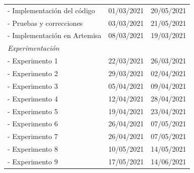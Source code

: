 \begin{table}[!h]
\begin{tabular}{lll}
\multicolumn{1}{l|}{- Implementación del código}                   & \multicolumn{1}{l|}{01/03/2021}                               & 20/05/2021                            \\
\multicolumn{1}{l|}{- Pruebas y correcciones}                      & \multicolumn{1}{l|}{03/03/2021}                               & 21/05/2021                            \\
\multicolumn{1}{l|}{- Implementación en Artemisa}                  & \multicolumn{1}{l|}{08/03/2021}                               & 19/03/2021                            \\ \hline
\multicolumn{3}{l}{\textit{Experimentación}}                                                                                                                                        \\ \hline
\multicolumn{1}{l|}{- Experimento 1}                               & \multicolumn{1}{l|}{22/03/2021}                               & 26/03/2021                            \\
\multicolumn{1}{l|}{- Experimento 2}                               & \multicolumn{1}{l|}{29/03/2021}                               & 02/04/2021                            \\
\multicolumn{1}{l|}{- Experimento 3}                               & \multicolumn{1}{l|}{05/04/2021}                               & 09/04/2021                            \\
\multicolumn{1}{l|}{- Experimento 4}                               & \multicolumn{1}{l|}{12/04/2021}                               & 28/04/2021                            \\
\multicolumn{1}{l|}{- Experimento 5}                               & \multicolumn{1}{l|}{19/04/2021}                               & 23/04/2021                            \\
\multicolumn{1}{l|}{- Experimento 6}                               & \multicolumn{1}{l|}{26/04/2021}                               & 07/05/2021                            \\
\multicolumn{1}{l|}{- Experimento 7}                               & \multicolumn{1}{l|}{26/04/2021}                               & 07/05/2021                            \\
\multicolumn{1}{l|}{- Experimento 8}                               & \multicolumn{1}{l|}{10/05/2021}                               & 14/05/2021                            \\
\multicolumn{1}{l|}{- Experimento 9}                               & \multicolumn{1}{l|}{17/05/2021}                               & 14/06/2021                            \\

\end{tabular}
\end{table}
